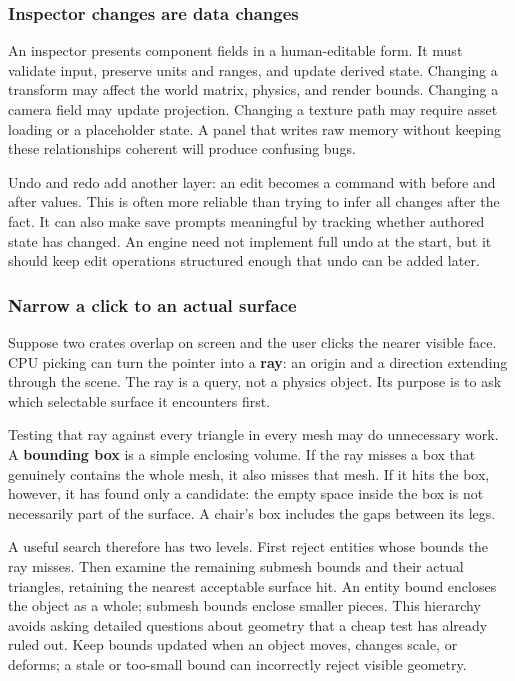 \subsubsection{Inspector changes are data changes}\label{06-engine-ii-ch032-inspector-changes-are-data-changes}

\hypertarget{06-engine-ii-ch032-inspector-changes-are-data-changes}{}

An inspector presents component fields in a human-editable form. It must validate input, preserve units and ranges, and update derived state. Changing a transform may affect the world matrix, physics, and render bounds. Changing a camera field may update projection. Changing a texture path may require asset loading or a placeholder state. A panel that writes raw memory without keeping these relationships coherent will produce confusing bugs.

Undo and redo add another layer: an edit becomes a command with before and after values. This is often more reliable than trying to infer all changes after the fact. It can also make save prompts meaningful by tracking whether authored state has changed. An engine need not implement full undo at the start, but it should keep edit operations structured enough that undo can be added later.

\subsubsection{Narrow a click to an actual surface}\label{06-engine-ii-ch032-narrow-a-click-to-an-actual-surface}

\hypertarget{06-engine-ii-ch032-narrow-a-click-to-an-actual-surface}{}

Suppose two crates overlap on screen and the user clicks the nearer visible face. CPU picking can turn the pointer into a \textbf{ray}: an origin and a direction extending through the scene. The ray is a query, not a physics object. Its purpose is to ask which selectable surface it encounters first.

Testing that ray against every triangle in every mesh may do unnecessary work. A \textbf{bounding box} is a simple enclosing volume. If the ray misses a box that genuinely contains the whole mesh, it also misses that mesh. If it hits the box, however, it has found only a candidate: the empty space inside the box is not necessarily part of the surface. A chair's box includes the gaps between its legs.

A useful search therefore has two levels. First reject entities whose bounds the ray misses. Then examine the remaining submesh bounds and their actual triangles, retaining the nearest acceptable surface hit. An entity bound encloses the object as a whole; submesh bounds enclose smaller pieces. This hierarchy avoids asking detailed questions about geometry that a cheap test has already ruled out. Keep bounds updated when an object moves, changes scale, or deforms; a stale or too-small bound can incorrectly reject visible geometry.

